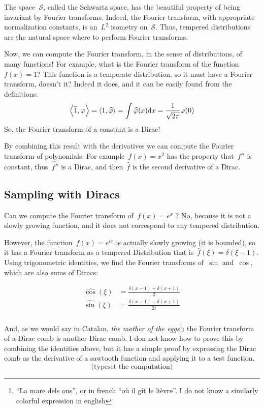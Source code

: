 The space~$\mathcal{S}$, called the Schwartz space, has the beautiful
property of being invariant by Fourier transforms.  Indeed, the Fourier
transform, with appropriate normalization constants, is an~$L^2$
isometry on~$\mathcal{S}$.  Thus, tempered distributions are the
natural space where to perform Fourier transforms.

Now, we can compute the Fourier transform, in the sense of
distributions, of many functions!  For example, what is the Fourier
transform of the function~$f(x)=1$?  This function is a temperate
distribution, so it must have a Fourier transform, doesn't it?
Indeed it does, and it can be easily found from the definitions:
$$
\left<\widehat{1},\varphi\right>
=
\left<1,\widehat{\varphi}\right>
=
\int\widehat{\varphi}(x)\mathrm{d} x
=
\frac{1}{\sqrt{2\pi}}\varphi(0)
$$
So, the Fourier transform of a constant is a Dirac!

By combining this result with the derivatives we can compute the
Fourier transform of polynomials.  For example~$f(x)=x^2$ has the
property that~$f''$ is constant, thus~$\widehat{f''}$ is a Dirac, and
then~$\widehat{f}$ is the second derivative of a Dirac.


\subsection{Sampling with Diracs}

Can we compute the Fourier transform of~$f(x)=e^x$ ?  No, because it
is not a slowly growing function, and it does not correspond to any
tempered distribution.

However, the function~$f(x)=e^{ix}$ is actually slowly growing (it is
bounded), so it has a Fourier transform as a tempered Distribution
that is~$\widehat{f}(\xi)=\delta(\xi-1)$.  Using trigonometric
identities, we find the Fourier transforms of~$\sin$ and~$\cos$,
which are also sums of Diracs:

\begin{eqnarray*}
	\widehat{\cos}(\xi) &=\frac{\delta(x-1)+\delta(x+1)}{2} \\
	\widehat{\sin}(\xi) &=\frac{\delta(x-1)-\delta(x+1)}{2i} \\
\end{eqnarray*}

And, as we would say in Catalan, \emph{the mother of the
eggs}\footnote{``La mare dels ous'', or in french ``où il gît le
lièvre''.  I do not know a similarly colorful expression in english}: the
Fourier transform of a Dirac comb is another Dirac comb.  I don not
know how to prove this by combining the identities above, but it has
a simple proof by expressing the Dirac comb as the derivative of a
sawtooth function and applying it to a test function.
$$
\textrm{(typeset the computation)}
$$

